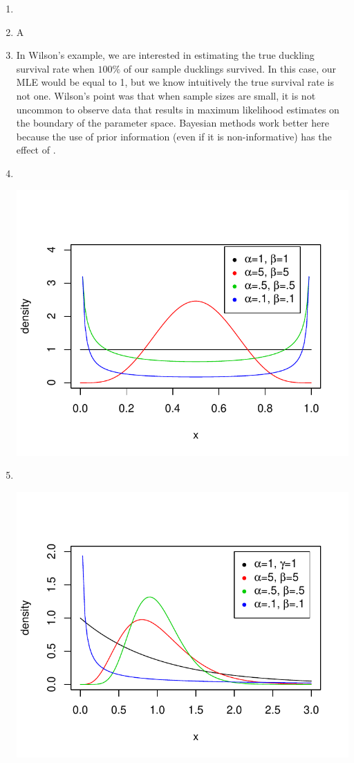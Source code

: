 \documentclass[12pt]{article}\usepackage[]{graphicx}\usepackage[]{color}
\newenvironment{knitrout}{}{} %
\begin{document}
\begin{enumerate}
\item 

\item A 

\item In Wilson's example, we are interested in estimating the true duckling survival rate when $100\%$ of our sample ducklings survived. In this case, our MLE would be equal to 1, but we know intuitively the true survival rate is not one. Wilson's point was that when sample sizes are small, it is not uncommon to observe data that results in maximum likelihood estimates on the boundary of the parameter space. Bayesian methods work better here because the use of prior information (even if it is non-informative) has the effect of .

\item ~
\begin{knitrout}\footnotesize
{}\color{fgcolor}

{\centering \includegraphics[width=.6\linewidth]{figure/prob6-1} 

}



\end{knitrout}

\item ~
\begin{knitrout}\footnotesize
{}\color{fgcolor}

{\centering \includegraphics[width=.6\linewidth]{figure/prob7-1} 

}
\end{knitrout}
\end{enumerate}
\end{document}
